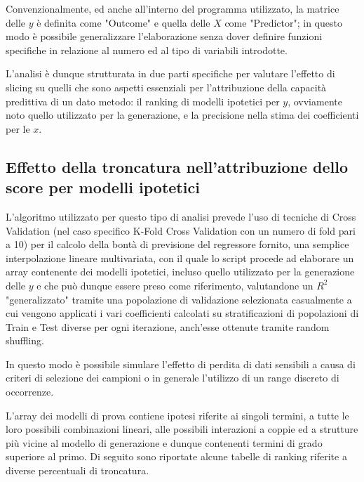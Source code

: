 \documentclass[12pt,openright,twoside,a4paper]{book}
\begin{document}
Convenzionalmente, ed anche all'interno del programma utilizzato, la matrice delle $y$ è definita come "Outcome" e quella delle $X$ come "Predictor"; in questo modo è possibile generalizzare l'elaborazione senza dover definire funzioni specifiche in relazione al numero ed al tipo di variabili introdotte.

L'analisi è dunque strutturata in due parti specifiche per valutare l'effetto di slicing su quelli che sono aspetti essenziali per l'attribuzione della capacità predittiva di un dato metodo: il ranking di modelli ipotetici per $y$, ovviamente noto quello utilizzato per la generazione, e la precisione nella stima dei coefficienti per  le $x$.

\subsection{Effetto della troncatura nell'attribuzione dello score per modelli ipotetici}
L'algoritmo utilizzato per questo tipo di analisi prevede l'uso di tecniche di Cross Validation (nel caso specifico K-Fold Cross Validation con un numero di fold pari a 10) per il calcolo della bontà di previsione del regressore fornito,  una semplice interpolazione lineare multivariata, con il quale lo script procede ad elaborare un array contenente dei modelli ipotetici, incluso quello utilizzato per la generazione delle $y$ e che può dunque essere preso come riferimento, valutandone un $R^2$ "generalizzato" tramite una popolazione di validazione selezionata casualmente a cui vengono applicati i vari coefficienti calcolati su stratificazioni di popolazioni di Train e Test diverse per ogni iterazione, anch'esse ottenute tramite random shuffling.

In questo modo è possibile simulare l'effetto di perdita di dati sensibili a causa di criteri di selezione dei campioni o in generale l'utilizzo di un range discreto di occorrenze.

L'array dei modelli di prova contiene ipotesi riferite ai singoli termini, a tutte le loro possibili combinazioni lineari, alle possibili interazioni a coppie ed a strutture più vicine al modello di generazione e dunque contenenti termini di grado superiore al primo.
Di seguito sono riportate alcune tabelle di ranking riferite a diverse percentuali di troncatura.
\end{document}
